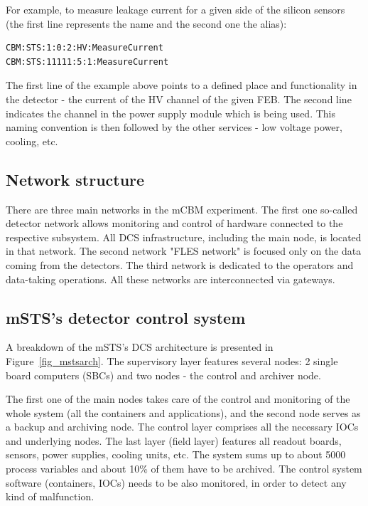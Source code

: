 For example, to measure leakage current for a given side of the silicon sensors  (the first line represents the name and the second one the alias):
\begin{verbatim}
CBM:STS:1:0:2:HV:MeasureCurrent
CBM:STS:11111:5:1:MeasureCurrent
\end{verbatim}
The first line of the example above points to a defined place and functionality in the detector - the current of the \gls{HV} channel of the given \gls{FEB}. The second line indicates the channel in the power supply module which is being used. This naming convention is then followed by the other services - low voltage power, cooling, etc.  
\subsection{Network structure}
There are three main networks in the mCBM experiment. The first one so-called detector network allows monitoring and control of hardware connected to the respective subsystem. All \gls{DCS} infrastructure, including the main node, is located in that network. The second network "FLES network" is focused only on the data coming from the detectors. The third network is dedicated to the operators and data-taking operations. All these networks are interconnected via gateways.  

\subsection{mSTS's detector control system}
A breakdown of the \gls{mSTS}'s \gls{DCS} architecture is presented in Figure~\ref{fig_mstsarch}. The supervisory layer features several nodes: 2 single board computers (\glspl{SBC}) and two nodes - the control and archiver node. 

The first one of the main nodes takes care of the control and monitoring of the whole system (all the containers and applications), and the second node serves as a backup and archiving node. The control layer comprises all the necessary \glspl{IOC} and underlying nodes. The last layer (field layer) features all readout boards, sensors, power supplies, cooling units, etc. The system sums up to about 5000 process variables and about 10\% of them have to be archived. The control system software (containers, \glspl{IOC}) needs to be also monitored, in order to detect any kind of malfunction. 


